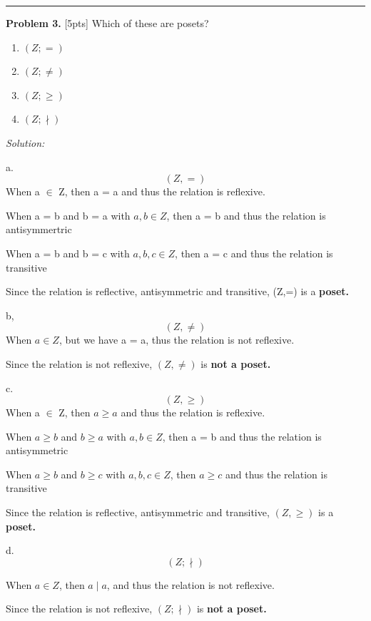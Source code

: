 \documentclass[12pt]{amsart}
\begin{document}
\smallskip

\hrule

\bigskip

\bigskip 

\textbf{Problem 3. }[5pts] Which of these are posets?
\begin{enumerate}
    \item $(Z; =)$
    \item $(Z;\neq )$
    \item $(Z;\geq)$
    \item $(Z;\nmid)$
\end{enumerate}

\bigskip

\bigskip
\textit{Solution:}
\medskip

a. \[(Z,=)\]When a $\in$ Z, then a = a and thus the relation is reflexive.

When a = b and b = a with $a,b \in Z$, then a = b and thus the relation is antisymmertric

When a = b and b = c with $a,b,c \in Z$, then a = c and thus the relation is transitive

Since the relation is reflective, antisymmetric and transitive, (Z,=) is a \textbf{poset.}

b, \[(Z,\neq)\] When $a\in Z$, but we have a = a, thus the relation is not reflexive.

Since the relation is not reflexive, $(Z,\neq)$ is \textbf{not a poset.}

c. \[(Z,\geq)\]When a $\in$ Z, then $a\geq a$ and thus the relation is reflexive.

When $a\geq b$ and $b\geq a$ with $a,b \in Z$, then a = b and thus the relation is antisymmetric

When $a\geq b$ and $b\geq c$ with $a,b,c \in Z$, then $a\geq c$ and thus the relation is transitive

Since the relation is reflective, antisymmetric and transitive, $(Z,\geq)$ is a \textbf{poset.}

d. \[(Z;\nmid)\]

When $a\in Z$, then $a \mid a$, and thus the relation is not reflexive.

Since the relation is not reflexive, $(Z;\nmid)$ is \textbf{not a poset.}

\newpage
\end{document}
